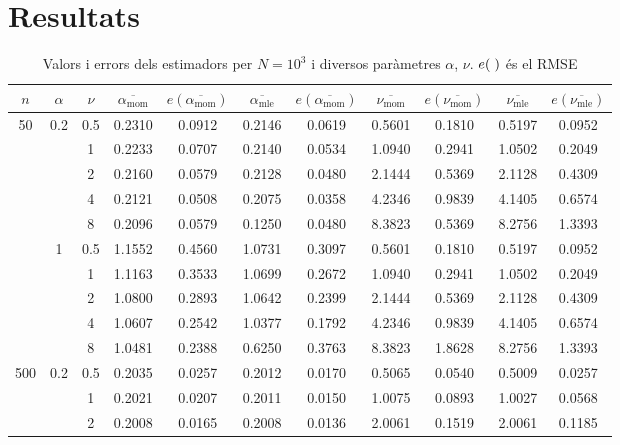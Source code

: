 \documentclass[12pt, catalan]{article}
\numberwithin{table}{section}
\numberwithin{figure}{section}
\numberwithin{equation}{section}
\begin{document}
\section{Resultats}
\begin{table}[htb]
	\centering
	\caption{Valors i errors dels estimadors per $N=10^3$ i diversos paràmetres $\alpha$, $\nu$. $e(\hspace{1mm})$ és el RMSE}
	\begin{tabular}{c|c|c||cc|cc||cc|cc}
		$n$ & $\alpha$ & $\nu$ & $\overline{\alpha_\text{mom}}$ & $e(\overline{\alpha_\text{mom}})$ & $\overline{\alpha_\text{mle}}$ & $e(\overline{\alpha_\text{mom}})$ & $\overline{\nu_\text{mom}}$ & $e(\overline{\nu_\text{mom}})$ & $\overline{\nu_\text{mle}}$ & $e(\overline{\nu_\text{mle}})$\\\hline
		\multirow{10}{*}{50} & \multirow{5}{*}{0.2} 
												 & 0.5 & 0.2310 & 0.0912 & 0.2146 & 0.0619 & 0.5601 & 0.1810 & 0.5197 & 0.0952\\
												 && 1 & 0.2233 & 0.0707 & 0.2140 & 0.0534 & 1.0940 & 0.2941 & 1.0502 & 0.2049\\
												 && 2 & 0.2160 & 0.0579 & 0.2128 & 0.0480 & 2.1444 & 0.5369 & 2.1128 & 0.4309\\
												 && 4 & 0.2121 & 0.0508 & 0.2075 & 0.0358 & 4.2346 & 0.9839 & 4.1405 & 0.6574\\
												 && 8 & 0.2096 & 0.0579 & 0.1250 & 0.0480 & 8.3823 & 0.5369 & 8.2756 & 1.3393\\\cline{2-11} & \multirow{5}{*}{1} 
												 & 0.5 & 1.1552 & 0.4560 & 1.0731 &  0.3097 & 0.5601 & 0.1810 & 0.5197 & 0.0952\\
												 && 1 & 1.1163 & 0.3533 & 1.0699 & 0.2672 & 1.0940 & 0.2941 & 1.0502 & 0.2049\\
												 && 2 & 1.0800 & 0.2893 & 1.0642 & 0.2399 & 2.1444 & 0.5369 & 2.1128 & 0.4309\\
												 && 4 & 1.0607 & 0.2542 & 1.0377 & 0.1792 & 4.2346 & 0.9839 & 4.1405 & 0.6574\\
												 && 8 & 1.0481 & 0.2388 & 0.6250 & 0.3763 & 8.3823 & 1.8628 & 8.2756 & 1.3393\\\hline\hline
		\multirow{10}{*}{500} & \multirow{5}{*}{0.2}
													& 0.5 & 0.2035 & 0.0257 & 0.2012 & 0.0170 & 0.5065 & 0.0540 & 0.5009 & 0.0257\\
													&& 1 & 0.2021 & 0.0207 & 0.2011 & 0.0150 & 1.0075 & 0.0893 & 1.0027 & 0.0568\\
													&& 2 & 0.2008 & 0.0165 & 0.2008 & 0.0136 & 2.0061 & 0.1519 & 2.0061 & 0.1185\\

\end{tabular}
\end{table}
\end{document}
